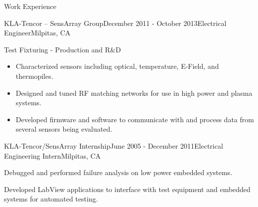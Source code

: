 \documentclass{resume} %
\begin{document}
\begin{rSection}{Work Experience}
\begin{rSubsection2}{KLA-Tencor -- SensArray Group}{December 2011 - October 2013}{Electrical Engineer}{Milpitas, CA}
\item Test Fixturing - Production and R\&D
\begin{itemize}
\itemsep -0.5em \vspace{-0.5em}
\renewcommand{\labelitemi}{-}
\item Characterized sensors including optical, temperature, E-Field, and thermopiles.
\item Designed and tuned RF matching networks for use in high power and plasma systems.
\item Developed firmware and software to communicate with and process data from several sensors being evaluated.
\end{itemize}
\end{rSubsection2}

\pagebreak[2]
\begin{rSubsection}{KLA-Tencor/SensArray Internship}{June 2005 - December 2011}{Electrical Engineering Intern}{Milpitas, CA}
\item Debugged and performed failure analysis on low power embedded systems. 
\item Developed LabView applications to interface with test equipment and embedded systems for automated testing.
\end{rSubsection}
\end{rSection}
\end{document}
